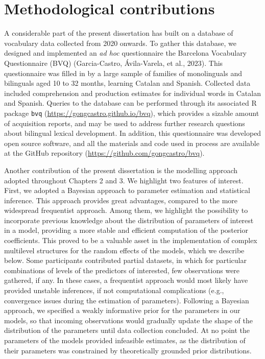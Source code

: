 \documentclass[
  12pt,
  b5paperpaper,
  twoside]{scrreprt}
\begin{document}
\hypertarget{methodological-contributions}{%
\section{Methodological
contributions}\label{methodological-contributions}}

A considerable part of the present dissertation has built on a database
of vocabulary data collected from 2020 onwards. To gather this database,
we designed and implemented an \emph{ad hoc} questionnaire the Barcelona
Vocabulary Questionnaire (BVQ) (Garcia-Castro, Ávila-Varela, et al.,
2023). This questionnaire was filled in by a large sample of families of
monolinguals and bilinguals aged 10 to 32 months, learning Catalan and
Spanish. Collected data included comprehension and production estimates
for individual words in Catalan and Spanish. Queries to the database can
be performed through its associated R package \texttt{bvq}
(\url{https://gongcastro.github.io/bvq}), which provides a sizable
amount of acquisition reports, and may be used to address further
research questions about bilingual lexical development. In addition,
this questionnaire was developed open source software, and all the
materials and code used in process are available at the GitHub
repository (\url{https://github.com/gongcastro/bvq}).

Another contribution of the present dissertation is the modelling
approach adopted throughout Chapters 2 and 3. We highlight two features
of interest. First, we adopted a Bayesian approach to parameter
estimation and statistical inference. This approach provides great
advantages, compared to the more widespread frequentist approach. Among
them, we highlight the possibility to incorporate previous knowledge
about the distribution of parameters of interest in a model, providing a
more stable and efficient computation of the posterior coefficients.
This proved to be a valuable asset in the implementation of complex
multilevel structures for the random effects of the models, which we
describe below. Some participants contributed partial datasets, in which
for particular combinations of levels of the predictors of interested,
few observations were gathered, if any. In these cases, a frequentist
approach would most likely have provided unstable inferences, if not
computational complications (e.g., convergence issues during the
estimation of parameters). Following a Bayesian approach, we specified a
weakly informative prior for the parameters in our models, so that
incoming observations would gradually update the shape of the
distribution of the parameters until data collection concluded. At no
point the parameters of the models provided infeasible estimates, as the
distribution of their parameters was constrained by theoretically
grounded prior distributions.
\end{document}
